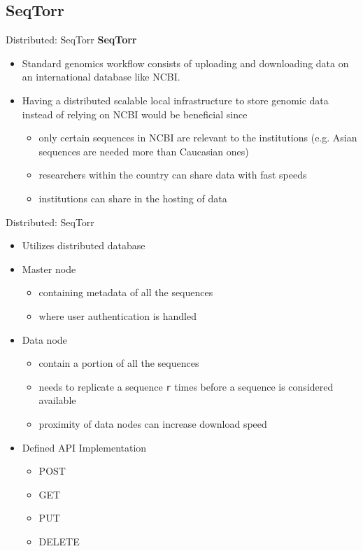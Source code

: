 \documentclass{beamer}
\begin{document}
    \subsection{SeqTorr}
    \begin{frame}{Distributed: SeqTorr}
    \textbf{SeqTorr} \cite{seqtorr}
    \begin{itemize}
        \item Standard genomics workflow consists of uploading and downloading data on an international database like NCBI.
        \item Having a distributed scalable local infrastructure to store genomic data instead of relying on NCBI would be beneficial since
        \begin{itemize}
            \item only certain sequences in NCBI are relevant to the institutions (e.g. Asian sequences are needed more than Caucasian ones)
            \item researchers within the country can share data with fast speeds
            \item institutions can share in the hosting of data
        \end{itemize}
    \end{itemize}
    \end{frame}
    \begin{frame}{Distributed: SeqTorr}
    \begin{itemize}
        \item Utilizes distributed database
        \item Master node
        \begin{itemize}
            \item containing metadata of all the sequences
            \item where user authentication is handled
        \end{itemize}
        \item Data node
        \begin{itemize}
            \item contain a portion of all the sequences
            \item needs to replicate a sequence \texttt{r} times before a sequence is considered available
            \item proximity of data nodes can increase download speed
        \end{itemize}
        \item Defined API Implementation
        \begin{itemize}
            \item POST
            \item GET
            \item PUT
            \item DELETE
        \end{itemize}

    \end{itemize}
    \end{frame}
    
\end{document}
